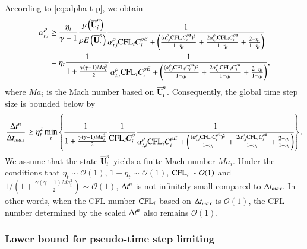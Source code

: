 According to \eqref{eq:alpha-t-p}, we obtain
\begin{equation}
    \begin{aligned}
        \label{eq:alpha-t-p-lb}
        \alpha_{t,i}^{p} 
        & \geq \dfrac{\eta_t}{\gamma-1} \frac{p\left(\overline{\mathbf{U}}^n_i\right)}{
            \rho E\left(\overline{\mathbf{U}}^n_i\right)
        }
        \frac{1}{
         \alpha_{t,i}^\rho\text{CFL}_i C^{\rho E}_i  
            +\left(
            \frac{(\alpha_{t,i}^\rho\text{CFL}_i C^{\rho \mathbf{u}}_i)^2}{1-\eta_t}
            +\frac{2\alpha_{t,i}^\rho\text{CFL}_i C^{\rho \mathbf{u}}_i}{1-\eta_t}
            + \frac{2-\eta_t}{1-\eta_t}
            \right)
        } \\
        & = \eta_t \frac{1}{
           1 + \frac{\gamma (\gamma-1) Ma_i^2}{2}
        }
        \frac{1}{
         \alpha_{t,i}^\rho\text{CFL}_i C^{\rho E}_i  
            +\left(
            \frac{(\alpha_{t,i}^\rho\text{CFL}_i C^{\rho \mathbf{u}}_i)^2}{1-\eta_t}
            +\frac{2\alpha_{t,i}^\rho\text{CFL}_i C^{\rho \mathbf{u}}_i}{1-\eta_t}
            + \frac{2-\eta_t}{1-\eta_t}
            \right)
        },
    \end{aligned}
\end{equation}
where $Ma_i$ is the Mach number based on $\overline{\mathbf{U}}^n_i$. 
Consequently, the global time step size is bounded below by
\begin{equation}
    \label{eq:delta-t-lb}
    \frac{\mathrm\Delta t^n}{\mathrm\Delta t_{max}} \geq 
    \eta_t^2
    \min_i
    \left\{
    \frac{1}{
           1 + \frac{\gamma (\gamma-1) Ma_i^2}{2}
        }
    \frac{1}{\text{CFL}_i C_i^\rho}
    \frac{1}{
     \alpha_{t,i}^\rho\text{CFL}_i C^{\rho E}_i  
        +\left(
        \frac{(\alpha_{t,i}^\rho\text{CFL}_i C^{\rho \mathbf{u}}_i)^2}{1-\eta_t}
        +\frac{2\alpha_{t,i}^\rho\text{CFL}_i C^{\rho \mathbf{u}}_i}{1-\eta_t}
        + \frac{2-\eta_t}{1-\eta_t}
        \right)
    }
    \right\}.
\end{equation}
We assume that the state $\overline{\mathbf{U}}^n_i$ yields a finite Mach number $Ma_i$.
Under the conditions that $\eta_t\sim\mathcal{O}(1)$, $1-\eta_t\sim\mathcal{O}(1)$,
$\text{CFL}_i\sim\mathcal{O}(1)$ and ${1}/\left(1 + \frac{\gamma (\gamma-1) Ma_i^2}{2}\right)\sim\mathcal{O}(1)$,
$\mathrm\Delta t^n$ is not infinitely small compared to $\mathrm\Delta t_{max}$.
In other words, when the CFL number $\text{CFL}_i$ based on $\mathrm\Delta t_{max}$ is $\mathcal{O}(1)$, 
the CFL number determined by the scaled $\mathrm\Delta t^n$ also remains $\mathcal{O}(1)$.

\subsubsection{Lower bound for pseudo-time step limiting}

